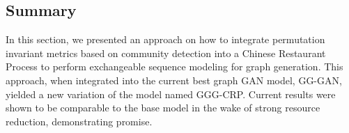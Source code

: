 \subsection{Summary}
\label{sec:conclusion}

In this section, we presented an approach on how to integrate permutation invariant metrics based on community detection into a Chinese Restaurant Process to perform exchangeable sequence modeling for graph generation. This approach, when integrated into the current best graph GAN model, GG-GAN, yielded a new variation of the model named GGG-CRP. Current results were shown to be comparable to the base model in the wake of strong resource reduction, demonstrating promise. 